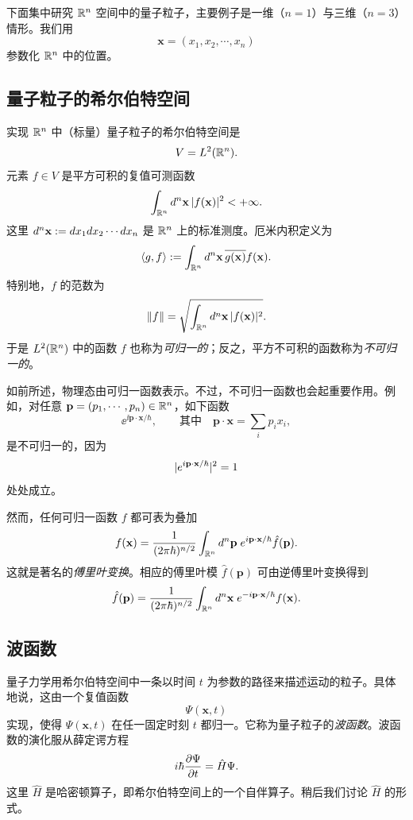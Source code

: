 下面集中研究 $\mathbb{R}^n$ 空间中的量子粒子，主要例子是一维（$n=1$）与三维（$n=3$）情形。我们用
\[
\mathbf x=(x_1,x_2,\cdots,x_n)
\]
参数化 $\mathbb{R}^n$ 中的位置。

\subsection{量子粒子的希尔伯特空间}

实现 $\mathbb{R}^n$ 中（标量）量子粒子的希尔伯特空间是
\[
V=L^2(\mathbb{R}^n).
\]
元素 $f\in V$ 是平方可积的复值可测函数
\[
\int_{\mathbb{R}^n}d^n\mathbf x\,\lvert f(\mathbf x)\rvert^2<+\infty.
\]
这里 $d^n\mathbf x:=d x_1d x_2\cdots d x_n$ 是 $\mathbb{R}^n$ 上的标准测度。厄米内积定义为
\[
\left\langle g,f\right\rangle:=\int_{\mathbb{R}^n}d^n\mathbf x\,\overline{g(\mathbf x)}f(\mathbf x).
\]
特别地，$f$ 的范数为
\[
\lVert f\rVert=\sqrt{\int_{\mathbb{R}^n}d^n\mathbf x\,\lvert f(\mathbf x)\rvert^2}.
\]
于是 $L^2(\mathbb{R}^n)$ 中的函数 $f$ 也称为\emph{可归一的}；反之，平方不可积的函数称为\emph{不可归一的}。

如前所述，物理态由可归一函数表示。不过，不可归一函数也会起重要作用。例如，对任意 $\mathbf p=(p_1,\cdots,p_n)\in\mathbb{R}^n$，如下函数
\[
\ee^{\ii\mathbf p\cdot\mathbf x/\hbar},
\qquad\text{其中}\quad
\mathbf p\cdot\mathbf x=\sum_i p_ix_i,
\]
是不可归一的，因为
\[
\lvert e^{i\mathbf p\cdot\mathbf x/\hbar}\rvert^2=1
\]
处处成立。

然而，任何可归一函数 $f$ 都可表为叠加
\[
f(\mathbf x)=\frac{1}{(2\pi\hbar)^{n/2}}
\int_{\mathbb{R}^n}d^n\mathbf p\;e^{i\mathbf p\cdot\mathbf x/\hbar}\hat f(\mathbf p).
\]
这就是著名的\emph{傅里叶变换}。相应的傅里叶模 $\hat f(\mathbf p)$ 可由逆傅里叶变换得到
\[
\hat f(\mathbf p)=\frac{1}{(2\pi\hbar)^{n/2}}
\int_{\mathbb{R}^n}d^n\mathbf x\;e^{-i\mathbf p\cdot\mathbf x/\hbar}f(\mathbf x).
\]

\subsection{波函数}

量子力学用希尔伯特空间中一条以时间 $t$ 为参数的路径来描述运动的粒子。具体地说，这由一个复值函数
\[
\Psi(\mathbf x,t)
\]
实现，使得 $\Psi(\mathbf x,t)$ 在任一固定时刻 $t$ 都归一。它称为量子粒子的\emph{波函数}。波函数的演化服从薛定谔方程
\[
i\hbar\frac{\partial\Psi}{\partial t}=\hat H\Psi.
\]
这里 $\hat H$ 是哈密顿算子，即希尔伯特空间上的一个自伴算子。稍后我们讨论 $\hat H$ 的形式。

